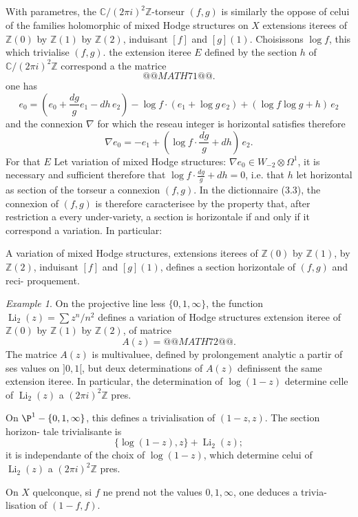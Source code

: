 \documentclass[12pt,a4paper]{article}
\theoremstyle{plain}
\theoremstyle{definition}
\theoremstyle{remark}
\newtheorem{example}[theorem]{Example}
\newcommand{\Z}{\mathbb{Z}}
\newcommand{\C}{\mathbb{C}}
\begin{document}
\subsection{}

With parametres, the $\C/(2\pi i)^2\Z$-torseur $(f,g)$ is similarly the oppose of celui
of the families holomorphic of mixed Hodge structures on $X$ extensions iterees of $\Z(0)$
by $\Z(1)$ by $\Z(2)$, induisant $[f]$ and $[g](1)$. Choisissons $\log f$, this which trivialise $(f,g)$.
the extension iteree $E$ defined by the section $h$ of $\C/(2\pi i)^2\Z$ correspond a the matrice
\[
@@MATH71@@.
\]
one has
\[
e_0 = (e_0 + \frac{dg}{g} e_1 - dh \, e_2) - \log f \cdot (e_1 + \log g \, e_2) + (\log f \log g + h) \, e_2
\]
and the connexion $\nabla$ for which the reseau integer is horizontal satisfies therefore
\[
\nabla e_0 = -e_1 + (\log f \cdot \frac{dg}{g} + dh) \, e_2.
\]
For that $E$ Let variation of mixed Hodge structures: $\nabla e_0 \in W_{-2} \otimes \Omega^1$,
it is necessary and sufficient therefore that $\log f \cdot \frac{dg}{g} + dh = 0$, i.e. that $h$ let horizontal as section of the
torseur a connexion $(f,g)$. In the dictionnaire (3.3), the connexion of $(f,g)$ is therefore
caracterisee by the property that, after restriction a every under-variety, a section is
horizontale if and only if it correspond a variation. In particular:

\begin{construction}
A variation of mixed Hodge structures, extensions iterees of $\Z(0)$
by $\Z(1)$, by $\Z(2)$, induisant $[f]$ and $[g](1)$, defines a section horizontale of $(f,g)$ and reci-
proquement.
\end{construction}

\begin{example}
On the projective line less $\{0, 1, \infty\}$, the function $\operatorname{Li}_2(z) = \sum z^n/n^2$
defines a variation of Hodge structures extension iteree of $\Z(0)$ by $\Z(1)$ by $\Z(2)$,
of matrice
\[
A(z) = @@MATH72@@.
\]
The matrice $A(z)$ is multivaluee, defined by prolongement analytic a partir of ses
values on $]0,1[$, but deux determinations of $A(z)$ definissent the same extension
iteree. In particular, the determination of $\log(1-z)$ determine celle of $\operatorname{Li}_2(z)$ a
$(2\pi i)^2\Z$ pres.

On $\P^1 - \{0, 1, \infty\}$, this defines a trivialisation of $(1-z, z)$. The section horizon-
tale trivialisante is
\[
\{\log(1-z), z\} + \operatorname{Li}_2(z);
\]
it is independante of the choix of $\log(1-z)$, which determine celui of $\operatorname{Li}_2(z)$ a $(2\pi i)^2\Z$ pres.

On $X$ quelconque, si $f$ ne prend not the values $0, 1, \infty$, one deduces a trivia-
lisation of $(1-f, f)$.
\end{example}
\end{document}

